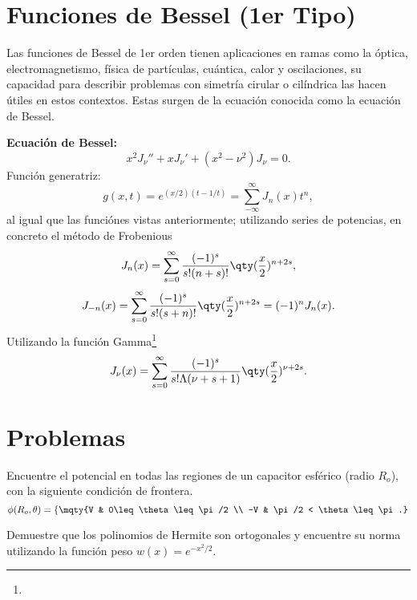 \section*{Funciones de Bessel (1er Tipo)}

Las funciones de Bessel de 1er orden tienen aplicaciones en ramas como la óptica, electromagnetismo, física de partículas, cuántica, calor y oscilaciones, su capacidad para describir problemas con simetría cirular o cilíndrica las hacen útiles en estos contextos. Estas surgen de la ecuación conocida como la ecuación de Bessel.

\begin{mdframed}[style=warning]
	{\Large \textbf{Ecuación de Bessel:}} \\
		$$ x^2 J_\nu '' + xJ_\nu ' + (x^2 - \nu ^2) J_\nu = 0. $$
	Función generatriz:
		$$ g(x,t) = e^{(x/2)(t - 1/t)} = \sum _{-\infty} ^\infty J_n (x) t^n , $$
	al igual que las funciónes vistas anteriormente; utilizando series de potencias, en concreto el método de Frobenious
		$$ J_n (x) = \sum _{s = 0} ^\infty \frac{(-1)^s}{s! (n + s)!} \qty(\frac{x}{2})^{n + 2s}, $$
		$$ J_{-n} (x) = \sum _{s = 0} ^\infty \frac{(-1)^s}{s! (s + n)!} \qty(\frac{x}{2})^{n +2s} = (-1)^n J_n (x). $$
	Utilizando la función Gamma\footnote{}
		$$ J_\nu (x) = \sum _{s = 0} ^\infty \frac{(-1)^s}{s! \Lambda (\nu + s + 1)} \qty(\frac{x}{2})^{\nu + 2s}. $$
\end{mdframed}







\pagebreak


\section*{Problemas}


\begin{ejercicio}
	Encuentre el potencial en todas las regiones de un capacitor esférico (radio $R_o$), con la siguiente condición de frontera.
		$$ \phi (R_o ,\theta) = \left\{ \mqty{V & 0\leq \theta \leq \pi /2 \\ -V & \pi/2 < \theta \leq \pi.} \right. $$
\end{ejercicio}












\begin{ejercicio}
	Demuestre que los polinomios de Hermite son ortogonales y encuentre su norma utilizando la función peso $w(x) = e^{-x^2 /2}$.
\end{ejercicio}














